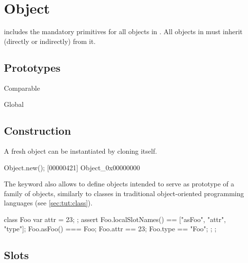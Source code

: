 
\section{Object}

 includes the mandatory primitives for all objects in \us.
All objects in \us must inherit (directly or indirectly) from it.

\subsection{Prototypes}

\begin{refObjects}
\item[Comparable]
\item[Global]
\end{refObjects}

\subsection{Construction}

A fresh object can be instantiated by cloning  itself.

\begin{urbiscript}[firstnumber=1]
Object.new();
[00000421] Object_0x00000000
\end{urbiscript}

The keyword  also allows to define objects intended to serve
as prototype of a family of objects, similarly to classes in traditional
object-oriented programming languages (see \autoref{sec:tut:class}).

\begin{urbiscript}
{
  class Foo
  {
    var attr = 23;
  };
  assert
  {
    Foo.localSlotNames() == ["asFoo", "attr", "type"];
    Foo.asFoo() === Foo;
    Foo.attr == 23;
    Foo.type == "Foo";
  };
};
\end{urbiscript}


\subsection{Slots}

